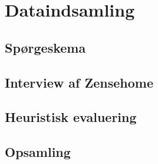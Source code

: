 \section{Dataindsamling}\label{sec:dataindsamling}
\subsection{Spørgeskema}
\subsection{Interview af Zensehome}
\subsection{Heuristisk evaluering} 
\subsection{Opsamling}